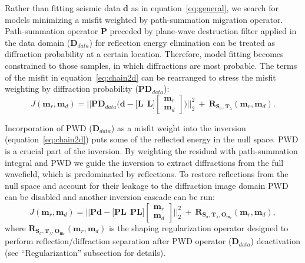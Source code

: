 Rather than fitting seismic
data $\mathbf{d}$ as in equation~\ref{eq:general}, we search for models
minimizing a misfit weighted by path-summation migration operator.
Path-summation operator {$\mathbf{P}$} preceded by plane-wave destruction filter applied in the data domain ($\mathbf{D}_{data}$) for reflection energy
elimination can be treated as diffraction probability at a certain location. Therefore,
model fitting becomes constrained to those samples, in which diffractions are most probable. The terms of the misfit
in equation~\ref{eq:chain2d} can be rearranged to stress the misfit weighting by diffraction probability ($\mathbf{P}\mathbf{D}_{data}$):
\begin{equation}
\label{eq:chain2}
J(\mathbf{m}_r,\mathbf{m}_d) = \Bigg|\Bigg| \mathbf{PD}_{data}\big( \mathbf{d} - \bigg[ \mathbf{L}\ \ \mathbf{L} \bigg] \begin{bmatrix} \mathbf{m}_r\\ \mathbf{m}_d \end{bmatrix} \big) \Bigg|\Bigg|_{2}^{2}\ +\ \mathbf{R}_{\mathbf{S}_{\sigma},\mathbf{T}_{\lambda}}(\mathbf{m}_r,\mathbf{m}_d).
\end{equation}

Incorporation of PWD ($\mathbf{D}_{data}$) as a misfit weight into the inversion (equation~\ref{eq:chain2d}) puts some of the reflected energy in the null space.  PWD is a crucial part of the inversion.
By weighting the residual with path-summation integral and PWD we guide the inversion to extract diffractions from the full wavefield, which is predominated by reflections.
To restore reflections from the null space and account for their leakage to the diffraction image domain PWD can be disabled and another inversion cascade can be run:
\begin{equation}
\label{eq:chainnopwd}
J(\mathbf{m}_r,\mathbf{m}_d) = \Bigg|\Bigg| \mathbf{P} \mathbf{d} - \bigg[ \mathbf{P}\mathbf{L}\ \ \mathbf{P}\mathbf{L} \bigg] \begin{bmatrix} \mathbf{m}_r\\ \mathbf{m}_d \end{bmatrix} \Bigg|\Bigg|_{2}^{2}\ +\ \mathbf{R}_{\mathbf{S}_{\sigma},\mathbf{T}_{\lambda},\mathbf{O}_{\mathbf{m}_r}}(\mathbf{m}_r,\mathbf{m}_d),
\end{equation}
where $\mathbf{R}_{\mathbf{S}_{\sigma},\mathbf{T}_{\lambda},\mathbf{O}_{\mathbf{m}_r}}(\mathbf{m}_r,\mathbf{m}_d)$ is the shaping regularization operator designed to
perform reflection/diffraction separation after PWD operator ($\mathbf{D}_{data}$) deactivation (see ``Regularization'' subsection for details).

